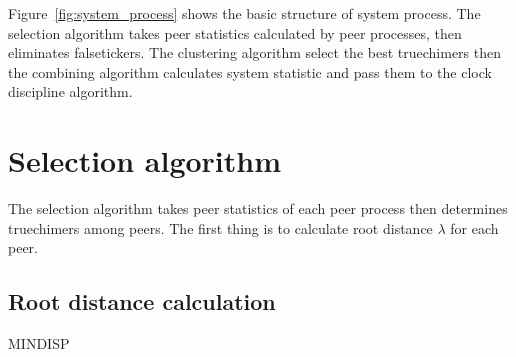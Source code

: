 Figure~\ref{fig:system_process} shows the basic structure of system process.
The selection algorithm takes peer statistics calculated by peer processes,
then eliminates falsetickers. The clustering algorithm select the best
truechimers then the combining algorithm calculates system statistic and pass
them to the clock discipline algorithm.




\section{Selection algorithm}%
\label{sec:selection_algorithm}
The selection algorithm takes peer statistics of each peer process then
determines truechimers among peers. The first thing is to calculate root
distance $\lambda$ for each peer.

\subsection{Root distance calculation}%
\label{sub:root_distance_calculation}

\begin{myverbbox}
    {\mindisp}MINDISP
\end{myverbbox}

